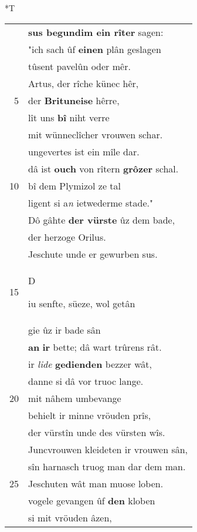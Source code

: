\documentclass[8pt,a4paper,notitlepage]{article}
\begin{document}
\begin{table}[ht]
\begin{minipage}[t]{0.5\linewidth}
\end{minipage}
\hspace{0.5cm}
\begin{minipage}[t]{0.5\linewidth}
\small
\begin{center}*T
\end{center}
\begin{tabular}{rl}
 & \textbf{sus begundim ein rîter} sagen:\\ 
 & "ich sach ûf \textbf{einen} plân geslagen\\ 
 & tûsent pavelûn oder mêr.\\ 
 & Artus, der rîche künec hêr,\\ 
5 & der \textbf{Brituneise} hêrre,\\ 
 & lît uns \textbf{bî} niht verre\\ 
 & mit wünneclîcher vrouwen schar.\\ 
 & ungevertes ist ein mîle dar.\\ 
 & dâ ist \textbf{ouch} von rîtern \textbf{grôzer} schal.\\ 
10 & bî dem Plymizol ze tal\\ 
 & ligent si a\textit{n} ietwederme stade."\\ 
 & Dô gâhte \textbf{der vürste} ûz dem bade,\\ 
 & der herzoge Orilus.\\ 
 & Jeschute unde er gewurben sus.\\ 
15 & \begin{large}D\end{large}iu senfte, süeze, wol getân\\ 
 & gie ûz ir bade sân\\ 
 & \textbf{an} \textbf{ir} bette; dâ wart trûrens rât.\\ 
 & ir \textit{lide} \textbf{gedienden} bezzer wât,\\ 
 & danne si dâ vor truoc lange.\\ 
20 & mit nâhem umbevange\\ 
 & behielt ir minne vröuden prîs,\\ 
 & der vürstîn unde des vürsten wîs.\\ 
 & Juncvrouwen kleideten ir vrouwen sân,\\ 
 & sîn harnasch truog man dar dem man.\\ 
25 & Jeschuten wât man muose loben.\\ 
 & vogele gevangen ûf \textbf{den} kloben\\ 
 & si mit vröuden âzen,\\ 

\end{tabular}
\end{minipage}
\end{table}
\end{document}
